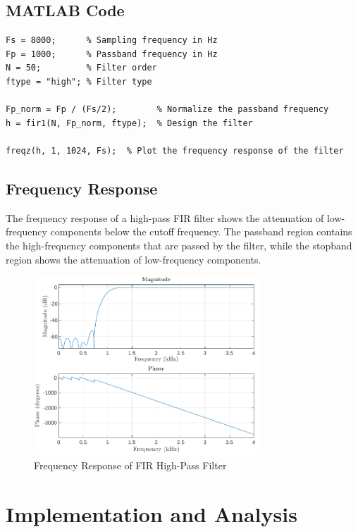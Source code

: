 \documentclass{zc-ust-hw}
\begin{document}
\subsection{MATLAB Code}

\begin{verbatim}
Fs = 8000;      % Sampling frequency in Hz
Fp = 1000;      % Passband frequency in Hz
N = 50;         % Filter order
ftype = "high"; % Filter type

Fp_norm = Fp / (Fs/2);        % Normalize the passband frequency
h = fir1(N, Fp_norm, ftype);  % Design the filter

freqz(h, 1, 1024, Fs);  % Plot the frequency response of the filter
\end{verbatim}

\subsection{Frequency Response} The frequency response of a high-pass FIR
filter shows the attenuation of low-frequency components below the cutoff
frequency. The passband region contains the high-frequency components that are
passed by the filter, while the stopband region shows the attenuation of
low-frequency components.

\begin{figure}[htbp]
  \centering
  \includegraphics[width=0.75\textwidth]{figures/high-pass-fir-filter.pdf}
  \caption{Frequency Response of FIR High-Pass Filter}
\end{figure}       

\newpage
\section{Implementation and Analysis}
\end{document}
